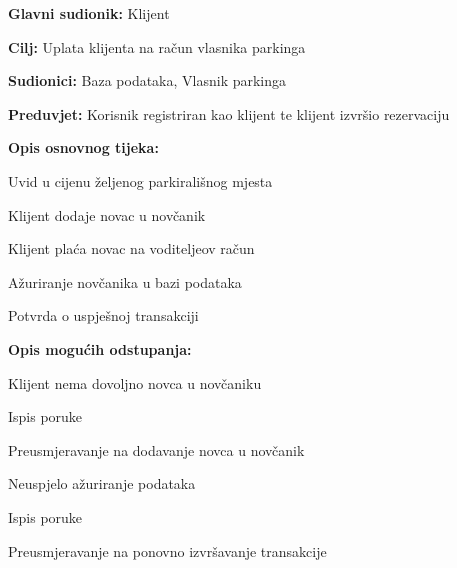 \begin{packed_item}
\begin{packed_item}
    				\item \textbf{Glavni sudionik: } Klijent
    				\item  \textbf{Cilj:} Uplata klijenta na račun vlasnika parkinga
    				\item  \textbf{Sudionici:} Baza podataka, Vlasnik parkinga
    				\item  \textbf{Preduvjet:} Korisnik registriran kao klijent te klijent izvršio rezervaciju
    				\item  \textbf{Opis osnovnog tijeka:}
    				
    				\item[] \begin{packed_enum}
    					
    					\item Uvid u cijenu željenog parkirališnog mjesta
    					\item Klijent dodaje novac u novčanik
    					\item Klijent plaća novac na voditeljeov račun
    					\item Ažuriranje novčanika u bazi podataka
    					\item Potvrda o uspješnoj transakciji

    				\end{packed_enum}
    				
    				\item  \textbf{Opis mogućih odstupanja:}
    				
    				\item[] \begin{packed_item}
    					
    					\item[2.a] Klijent nema dovoljno novca u novčaniku
    					\item[] \begin{packed_enum}
    						
    						\item Ispis poruke
    						\item Preusmjeravanje na dodavanje novca u novčanik
    						
    					\end{packed_enum}
    					\item[3.a] Neuspjelo ažuriranje podataka
						\item[] \begin{packed_enum}
							
							\item Ispis poruke
							\item Preusmjeravanje na ponovno izvršavanje transakcije
							

\end{packed_enum}
\end{packed_item}
\end{packed_item}
\end{packed_item}
